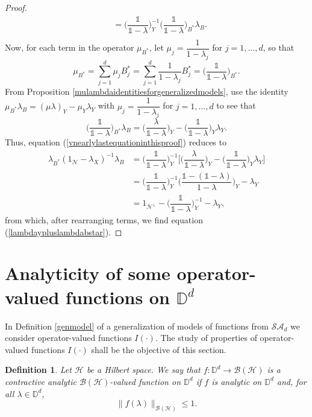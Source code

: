 \documentclass[11pt, reqno]{amsart}
\newtheorem{definition}[theorem]{Definition}
\newcommand\1{\boldsymbol {1}}
\newcommand{\sad}{\mathcal{SA}_d}
\numberwithin{equation}{section}
\begin{document}
\begin{proof}
\begin{align}
& = \bigg(\dfrac{\mathds{1}}{\mathds{1}-\lambda}\bigg)_{Y}^{-1}\bigg(\dfrac{\mathds{1}}{\mathds{1}-\lambda}\bigg)_{B^{*}}\lambda_{B}. \label{vnearlylastequationinthisproof}\\ \nonumber
\end{align}
Now, for each term in the operator $\mu_{B^{*}}$, let $\mu_{j}=\dfrac{1}{1-\lambda_{j}}$ for $j=1,\hdots,d$, so that
$$\mu_{B^{*}} = \sum_{j=1}^{d} \mu_{j}B_{j}^{*} = \sum_{j=1}^{d} \dfrac{1}{1-\lambda_{j}}B_{j}^{*} = \bigg(\dfrac{\mathds{1}}{\mathds{1}-\lambda}\bigg)_{B^{*}}.$$
From Proposition \ref{mulambdaidentitiesforgeneralizedmodels}, use the identity $\mu_{B^{*}}\lambda_{B} = (\mu\lambda)_{Y}-\mu_{Y}\lambda_{Y}$ with $\mu_{j}=\dfrac{1}{1-\lambda_{j}}$ for $j=1,\hdots,d$ to see that
$$ \bigg(\dfrac{\mathds{1}}{\mathds{1}-\lambda}\bigg)_{B^{*}}\lambda_{B} = \bigg(\dfrac{\lambda}{\mathds{1}-\lambda}\bigg)_{Y}-\bigg(\dfrac{\mathds{1}}{\mathds{1}-\lambda}\bigg)_{Y}\lambda_{Y}.$$
Thus, equation (\ref{vnearlylastequationinthisproof}) reduces to
\begin{align*}
\lambda_{B^{*}}(1_{\mathcal{N}}-\lambda_{X})^{-1}\lambda_{B} &= \bigg(\dfrac{\mathds{1}}{\mathds{1}-\lambda}\bigg)_{Y}^{-1}\Bigg[ \bigg(\dfrac{\lambda}{\mathds{1}-\lambda}\bigg)_{Y}-\bigg(\dfrac{\mathds{1}}{\mathds{1}-\lambda}\bigg)_{Y}\lambda_{Y}\Bigg] \\
 & = \bigg(\dfrac{\mathds{1}}{\mathds{1}-\lambda}\bigg)_{Y}^{-1}\bigg(\dfrac{\mathds{1}-(\mathds{1}-\lambda)}{1-\lambda}\bigg)_{Y}-\lambda_{Y} \\
 & = 1_{\mathcal{N}^{\perp}}-\bigg(\dfrac{\mathds{1}}{\mathds{1}-\lambda}\bigg)_{Y}^{-1} - \lambda_{Y},
\end{align*}
from which, after rearranging terms, we find equation (\ref{lambdaypluslambdabstar}).\end{proof}

\section{Analyticity of some operator-valued functions on $\mathbb{D}^{d}$}\label{analytic_I}

In Definition \ref{genmodel} of a generalization of models of functions from $\sad$ we consider operator-valued functions
$I(\cdot)$. The study of properties of  operator-valued functions $I(\cdot)$ shall be the objective of this section.
\begin{definition}
Let $\mathcal{H}$ be a Hilbert space. We say that 
$f:\mathbb{D}^{d} \to \mathcal{B}(\mathcal{H})$
is a contractive analytic $\mathcal{B}(\mathcal{H})$-valued  function on $\mathbb{D}^{d}$ if $f$ is analytic on $\mathbb{D}^{d}$ and, for all $\lambda\in\mathbb{D}^{d}$, 
$$ \| f(\lambda) \|_{\mathcal{B(H)}}\leq 1.$$ 
\end{definition}
\end{document}
